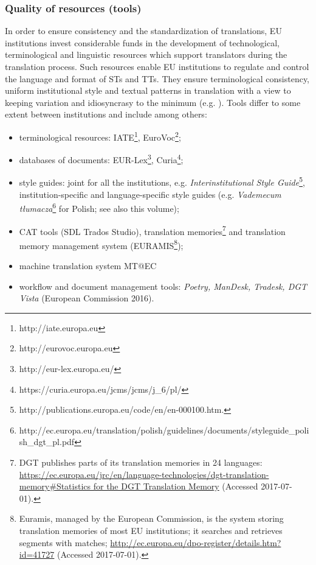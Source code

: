 \documentclass[output=paper]{langsci/langscibook}
\begin{document}
\subsubsection{Quality of resources (tools)}\label{sec:biel:3.2.4}

In order to ensure consistency and the standardization of translations, EU institutions invest considerable funds in the development of technological, terminological and linguistic resources which support translators during the translation process. Such resources enable EU institutions to regulate and control the language and format of STs and TTs. They ensure terminological consistency, uniform institutional style and textual patterns in translation with a view to keeping variation and idiosyncrasy to the minimum (e.g. \citealt[70]{Biel2014}). Tools differ to some extent between institutions and include among others:

\begin{itemize}
\item 
terminological resources: IATE\footnote{http://iate.europa.eu}, EuroVoc\footnote{http://eurovoc.europa.eu};
\item 
databases of documents: EUR-Lex\footnote{http://eur-lex.europa.eu/}, Curia\footnote{https://curia.europa.eu/jcms/jcms/j\_6/pl/};
\item 
style guides: joint for all the institutions, e.g. \textit{Interinstitutional Style Guide}\footnote{http://publications.europa.eu/code/en/en-000100.htm.}, institution-specific and language-specific style guides (e.g. \textit{Vademecum tłumacza}\footnote{http://ec.europa.eu/translation/polish/guidelines/documents/styleguide\_polish\_dgt\_pl.pdf} for Polish; see also \citealt{Svoboda2017} this volume);
\item 
CAT tools (SDL Trados Studio), translation memories\footnote{DGT publishes parts of its translation memories in 24 languages: \url{https://ec.europa.eu/jrc/en/language-technologies/dgt-translation-memory\#Statistics for the DGT Translation Memory} (Accessed 2017-07-01).} and translation memory management system (EURAMIS\footnote{Euramis, managed by the European Commission, is the system storing translation memories of most EU institutions; it searches and retrieves segments with matches; \url{http://ec.europa.eu/dpo-register/details.htm?id=41727} (Accessed 2017-07-01).});
\item 
machine translation system MT@EC
\item 
workflow and document management tools: \textit{Poetry, ManDesk, Trad}\textit{esk, DGT Vista} (European Commission 2016).
\end{itemize}
\end{document}
